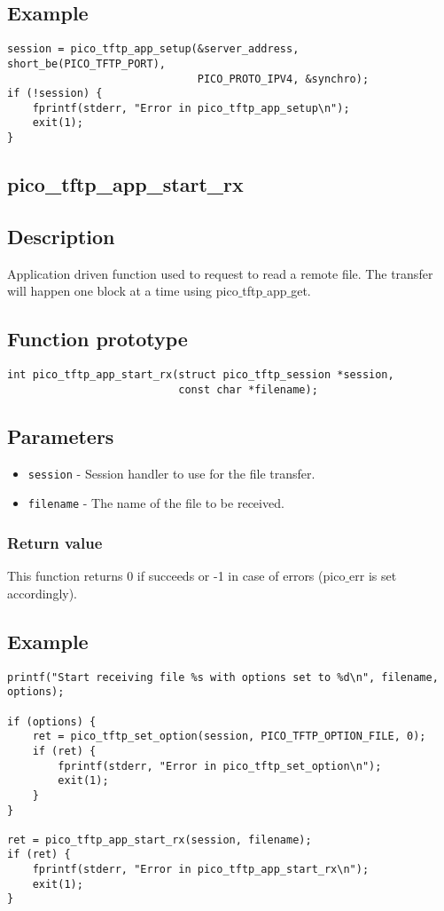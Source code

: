 \subsection*{Example}
\begin{verbatim}
session = pico_tftp_app_setup(&server_address, short_be(PICO_TFTP_PORT),
                              PICO_PROTO_IPV4, &synchro);
if (!session) {
    fprintf(stderr, "Error in pico_tftp_app_setup\n");
    exit(1);
}
\end{verbatim}


\subsection{pico\_tftp\_app\_start\_rx}

\subsection*{Description}
Application driven function used to request to read a remote file. The transfer will happen one block at a time using pico$\_$tftp$\_$app$\_$get.

\subsection*{Function prototype}
\begin{verbatim}
int pico_tftp_app_start_rx(struct pico_tftp_session *session,
                           const char *filename);
\end{verbatim}

\subsection*{Parameters}
\begin{itemize}[noitemsep]
\item \texttt{session} - Session handler to use for the file transfer.
\item \texttt{filename} - The name of the file to be received.
\end{itemize}

\subsubsection*{Return value}
This function returns 0 if succeeds or -1 in case of errors (pico$\_$err is set accordingly).

\subsection*{Example}
\begin{verbatim}
printf("Start receiving file %s with options set to %d\n", filename, options);

if (options) {
    ret = pico_tftp_set_option(session, PICO_TFTP_OPTION_FILE, 0);
    if (ret) {
        fprintf(stderr, "Error in pico_tftp_set_option\n");
        exit(1);
    }
}

ret = pico_tftp_app_start_rx(session, filename);
if (ret) {
    fprintf(stderr, "Error in pico_tftp_app_start_rx\n");
    exit(1);
}
\end{verbatim}


